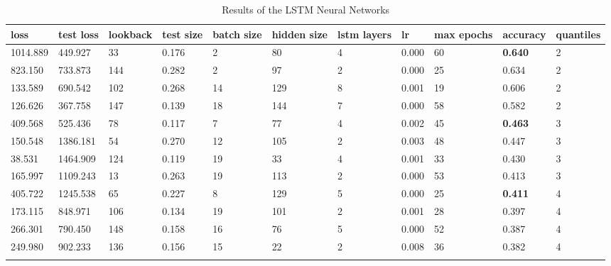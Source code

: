 \documentclass[sn-mathphys-num]{sn-jnl}
\begin{document}
\begin{table}
    \caption{Results of the LSTM Neural Networks}\label{tab2}
    \begin{tabular}{@{}lllllllllll@{}}
        \toprule%
        loss     & test loss & lookback & test size & batch size & hidden size & lstm layers & lr    & max epochs & accuracy       & quantiles \\
        \midrule
        1014.889 & 449.927   & 33       & 0.176     & 2          & 80          & 4           & 0.000 & 60         & \textbf{0.640} & 2         \\
        823.150  & 733.873   & 144      & 0.282     & 2          & 97          & 2           & 0.000 & 25         & 0.634          & 2         \\
        133.589  & 690.542   & 102      & 0.268     & 14         & 129         & 8           & 0.001 & 19         & 0.606          & 2         \\
        126.626  & 367.758   & 147      & 0.139     & 18         & 144         & 7           & 0.000 & 58         & 0.582          & 2         \\
        \midrule
        409.568  & 525.436   & 78       & 0.117     & 7          & 77          & 4           & 0.002 & 45         & \textbf{0.463} & 3         \\
        150.548  & 1386.181  & 54       & 0.270     & 12         & 105         & 2           & 0.003 & 48         & 0.447          & 3         \\
        38.531   & 1464.909  & 124      & 0.119     & 19         & 33          & 4           & 0.001 & 33         & 0.430          & 3         \\
        165.997  & 1109.243  & 13       & 0.263     & 19         & 113         & 2           & 0.000 & 53         & 0.413          & 3         \\
        \midrule
        405.722  & 1245.538  & 65       & 0.227     & 8          & 129         & 5           & 0.000 & 25         & \textbf{0.411} & 4         \\
        173.115  & 848.971   & 106      & 0.134     & 19         & 101         & 2           & 0.001 & 28         & 0.397          & 4         \\
        266.301  & 790.450   & 148      & 0.158     & 16         & 76          & 5           & 0.000 & 52         & 0.387          & 4         \\
        249.980  & 902.233   & 136      & 0.156     & 15         & 22          & 2           & 0.008 & 36         & 0.382          & 4         \\
        \botrule
    \end{tabular}
\end{table}
\unskip
\end{document}

